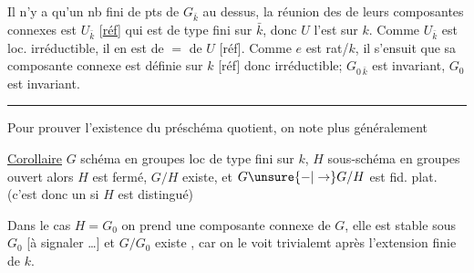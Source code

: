 Il n'y a qu'un nb fini de pts de
$G_{\bar k}$ au dessus,  la réunion des
de leurs composantes connexes est $U_{\bar k}$ [\uline{réf}]
\margin{$\times$} qui est de type fini sur
$\bar k$, donc $U$ l'est sur $k$. Comme $U_{\bar k}$ est
loc. irréductible, il en est de $=$ de $U$
\margin{$\times$}[réf]. Comme $e$ est rat/$k$, il s'ensuit
que sa composante connexe  est définie sur $k$
[réf] donc  irréductible;  
$G_{0\,\bar k}$ est invariant, $G_0$ est invariant.

\noindent\rule{1.15cm}{0.3pt}

Pour prouver l'existence du préschéma
quotient, on note plus généralement

\uline{Corollaire} \quad $G$ schéma en groupes loc de
type fini sur $k$, $H$ sous-schéma en
groupes ouvert  alors $H$ est
fermé,  $G/H$
existe, et $G\unsure{-|\to}G/H$ est fid. plat. (c'est
donc un  si $H$ est distingué)

 Dans le cas $H=G_0$
on prend une composante connexe de $G$,
elle est stable sous $G_0$ [à signaler \ldots]
et  $G/G_0$ existe , car on le
voit trivialemt après l'extension finie de $k$.
